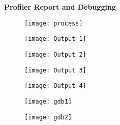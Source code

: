 \documentclass[12pt,a4paper]{article}
\begin{document}
\pagebreak
\pagebreak
\begin{center}
\textbf{\Large Profiler Report and Debugging}
\begin{figure}[b]
\texttt{[image: process]}
\end{figure}
\pagebreak
\pagebreak
\begin{figure}[]
\texttt{[image: Output 1]}
\end{figure}
\begin{figure}[]
\texttt{[image: Output 2]}
\end{figure}
\begin{figure}[]
\texttt{[image: Output 3]}
\end{figure}
\begin{figure}[!htb]
\texttt{[image: Output 4]}
\end{figure}
\end{center}
\pagebreak

\begin{figure}[]
\texttt{[image: gdb1]}
\end{figure}
\pagebreak
\begin{figure}[!htb]
\texttt{[image: gdb2]}
\end{figure}
\pagebreak
\end{document}
